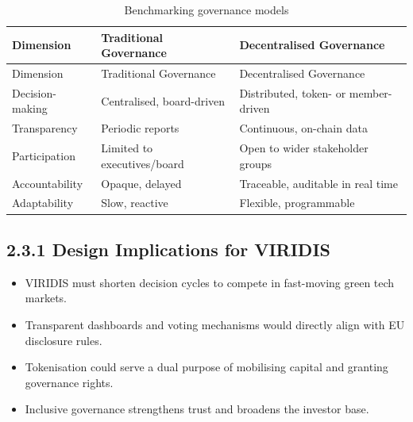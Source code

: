 \documentclass[
  english,
  12pt,
  oneside,
  open=any]{scrbook}
\providecommand{\tightlist}{%
  \setlength{\itemsep}{0pt}\setlength{\parskip}{0pt}}\usepackage{longtable,booktabs,array}
\begin{document}
\begin{longtable}[]{@{}
  >{\raggedright\arraybackslash}p{}
  >{\raggedright\arraybackslash}p{}
  >{\raggedright\arraybackslash}p{}@{}}
\caption{Benchmarking governance
models}\label{tbl-benchmark}\tabularnewline
\toprule\noalign{}
\begin{minipage}[b]{\linewidth}\raggedright
Dimension
\end{minipage} & \begin{minipage}[b]{\linewidth}\raggedright
Traditional Governance
\end{minipage} & \begin{minipage}[b]{\linewidth}\raggedright
Decentralised Governance
\end{minipage} \\
\midrule\noalign{}
\endfirsthead
\toprule\noalign{}
\begin{minipage}[b]{\linewidth}\raggedright
Dimension
\end{minipage} & \begin{minipage}[b]{\linewidth}\raggedright
Traditional Governance
\end{minipage} & \begin{minipage}[b]{\linewidth}\raggedright
Decentralised Governance
\end{minipage} \\
\midrule\noalign{}
\endhead
\bottomrule\noalign{}
\endlastfoot
Decision-making & Centralised, board-driven & Distributed, token- or
member-driven \\
Transparency & Periodic reports & Continuous, on-chain data \\
Participation & Limited to executives/board & Open to wider stakeholder
groups \\
Accountability & Opaque, delayed & Traceable, auditable in real time \\
Adaptability & Slow, reactive & Flexible, programmable \\
\end{longtable}

\subsection{2.3.1 Design Implications for
VIRIDIS}\label{sec-implications}

\begin{itemize}
\tightlist
\item
  VIRIDIS must shorten decision cycles to compete in fast-moving green
  tech markets.\\
\item
  Transparent dashboards and voting mechanisms would directly align with
  EU disclosure rules.\\
\item
  Tokenisation could serve a dual purpose of mobilising capital and
  granting governance rights.\\
\item
  Inclusive governance strengthens trust and broadens the investor base.
\end{itemize}
\end{document}
